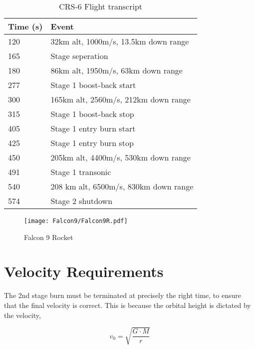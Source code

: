 \begin{table}[!htb]
\centering
\begin{tabular}{|l|l|}
\hline
\rowcolor[HTML]{C0C0C0} 
Time (s) & Event                                 \\ \hline
120      & 32km alt, 1000m/s, 13.5km down range  \\ \hline
\rowcolor[HTML]{EFEFEF} 
165      & Stage seperation                      \\ \hline
180      & 86km alt, 1950m/s, 63km down range    \\ \hline
\rowcolor[HTML]{EFEFEF} 
277      & Stage 1 boost-back start              \\ \hline
300      & 165km alt, 2560m/s, 212km down range  \\ \hline
\rowcolor[HTML]{EFEFEF} 
315      & Stage 1 boost-back stop               \\ \hline
405      & Stage 1 entry burn start              \\ \hline
\rowcolor[HTML]{EFEFEF} 
425      & Stage 1 entry burn stop               \\ \hline
450      & 205km alt, 4400m/s, 530km down range  \\ \hline
\rowcolor[HTML]{EFEFEF} 
491      & Stage 1 transonic                     \\ \hline
540      & 208 km alt, 6500m/s, 830km down range \\ \hline
\rowcolor[HTML]{EFEFEF} 
574      & Stage 2 shutdown \\ \hline
\end{tabular}
\caption{CRS-6 Flight transcript \cite{CRS6}}
\label{tab:CRS6}
\end{table}



\begin{figure}[!htb]
\centering
\texttt{[image: Falcon9/Falcon9R.pdf]}
\caption{Falcon 9 Rocket}
\label{fig:Rocket}
\end{figure}

\section{Velocity Requirements}
The 2nd stage burn must be terminated at precisely the right time, to ensure that the final velocity is correct. This is because the orbital height is dictated by the velocity, 

\begin{equation}
v_0 = \sqrt{\frac{G \cdot M}{r}}
\end{equation}

